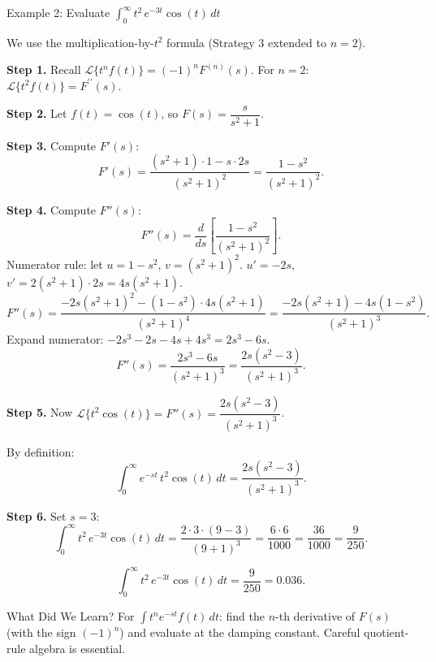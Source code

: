 \documentclass[12pt,a4paper]{article}
\begin{document}
\begin{infobox}{Example 2: Evaluate $\displaystyle\int_0^\infty
    t^2\, e^{-3t}\cos(t)\, dt$}

We use the multiplication-by-$t^2$ formula (Strategy 3 extended to $n = 2$).

\textbf{Step 1.} Recall $\mathcal{L}\{t^n f(t)\} = (-1)^n F^{(n)}(s)$.
For $n = 2$:
$\mathcal{L}\{t^2 f(t)\} = F^{\prime\prime}(s)$.

\textbf{Step 2.} Let $f(t) = \cos(t)$, so
$F(s) = \dfrac{s}{s^2+1}$.

\textbf{Step 3.} Compute $F'(s)$:
\[
  F'(s) = \frac{(s^2+1)\cdot 1 - s\cdot 2s}{(s^2+1)^2}
         = \frac{1 - s^2}{(s^2+1)^2}.
\]

\textbf{Step 4.} Compute $F''(s)$:
\[
  F''(s) = \frac{d}{ds}\!\left[\frac{1-s^2}{(s^2+1)^2}\right].
\]
Numerator rule: let $u = 1-s^2$, $v = (s^2+1)^2$.
$u' = -2s$, $v' = 2(s^2+1)\cdot 2s = 4s(s^2+1)$.
\[
  F''(s)
  = \frac{-2s(s^2+1)^2 - (1-s^2)\cdot 4s(s^2+1)}{(s^2+1)^4}
  = \frac{-2s(s^2+1) - 4s(1-s^2)}{(s^2+1)^3}.
\]
Expand numerator:
$-2s^3 - 2s - 4s + 4s^3 = 2s^3 - 6s$.
\[
  F''(s) = \frac{2s^3 - 6s}{(s^2+1)^3} = \frac{2s(s^2-3)}{(s^2+1)^3}.
\]

\textbf{Step 5.} Now $\mathcal{L}\{t^2\cos(t)\} = F''(s) = \dfrac{2s(s^2-3)}{(s^2+1)^3}$.

By definition:
\[
  \int_0^\infty e^{-st}\, t^2\cos(t)\, dt = \frac{2s(s^2-3)}{(s^2+1)^3}.
\]

\textbf{Step 6.} Set $s = 3$:
\[
  \int_0^\infty t^2\, e^{-3t}\cos(t)\, dt
  = \frac{2\cdot 3\cdot(9-3)}{(9+1)^3}
  = \frac{6\cdot 6}{1000}
  = \frac{36}{1000}
  = \frac{9}{250}.
\]

\[
  \boxed{\int_0^\infty t^2\, e^{-3t}\cos(t)\, dt = \frac{9}{250} = 0.036.}
\]

\end{infobox}

\begin{learnbox}{What Did We Learn?}
For $\int t^n e^{-st} f(t)\,dt$: find the $n$-th derivative of $F(s)$
(with the sign $(-1)^n$) and evaluate at the damping constant. Careful
quotient-rule algebra is essential.
\end{learnbox}
\end{document}
